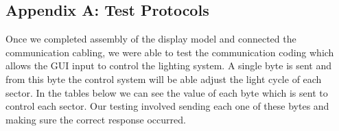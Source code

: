 \documentclass[12pt,a4paper]{report}
\begin{document}
\subsection{Appendix A: Test Protocols}
Once we completed assembly of the display model and connected the communication cabling, we were able to test the communication coding which allows the GUI input to control the lighting system. A single byte is sent and from this byte the control system will be able adjust the light cycle of each sector. In the tables below we can see the value of each byte which is sent to control each sector. Our testing involved sending each one of these bytes and making sure the correct response occurred.
\end{document}

